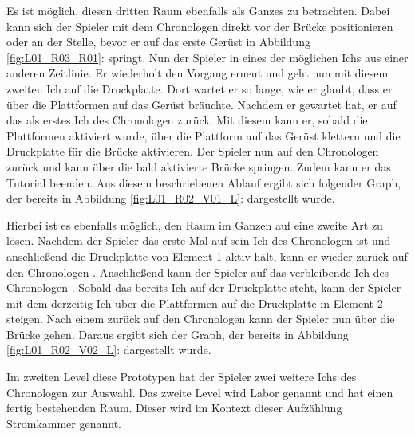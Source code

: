 Es ist möglich, diesen dritten Raum ebenfalls als Ganzes zu betrachten. Dabei kann sich der Spieler mit dem Chronologen direkt vor der Brücke positionieren oder an der Stelle, bevor er auf das erste Gerüst in Abbildung \ref{fig:L01_R03_R01}:  springt. Nun  der Spieler in eines der möglichen Ichs aus einer anderen Zeitlinie. Er wiederholt den Vorgang erneut und geht nun mit diesem zweiten Ich auf die Druckplatte. Dort wartet er so lange, wie er glaubt, dass er über die Plattformen auf das Gerüst bräuchte. Nachdem er gewartet hat,  er auf das als erstes  Ich des Chronologen zurück. Mit diesem kann er, sobald die Plattformen aktiviert wurde, über die Plattform auf das Gerüst klettern und die Druckplatte für die Brücke aktivieren. Der Spieler  nun auf den Chronologen zurück und kann über die bald aktivierte Brücke springen. Zudem kann er das Tutorial beenden.
Aus diesem beschriebenen Ablauf ergibt sich folgender Graph, der bereits in Abbildung \ref{fig:L01_R02_V01_L}:  dargestellt wurde.

Hierbei ist es ebenfalls möglich, den Raum im Ganzen auf eine zweite Art zu lösen. Nachdem der Spieler das erste Mal auf sein Ich des Chronologen  ist und anschließend die Druckplatte von Element 1 aktiv hält, kann er wieder zurück auf den Chronologen . Anschließend kann der Spieler auf das verbleibende Ich des Chronologen . Sobald das bereits  Ich auf der Druckplatte steht, kann der Spieler mit dem derzeitig  Ich über die Plattformen auf die Druckplatte in Element 2 steigen. Nach einem  zurück auf den Chronologen kann der Spieler nun über die Brücke gehen. Daraus ergibt sich der Graph, der bereits in Abbildung \ref{fig:L01_R02_V02_L}:  dargestellt wurde.

Im zweiten Level diese Prototypen hat der Spieler zwei weitere Ichs des Chronologen zur Auswahl. Das zweite Level wird Labor genannt und hat einen fertig bestehenden Raum. Dieser wird im Kontext dieser Aufzählung Stromkammer genannt.

